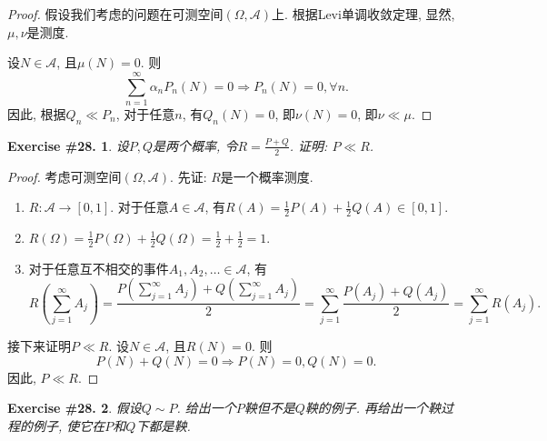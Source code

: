 \documentclass[UTF8, a4paper]{article}
\newtheorem{exercise}{Exercise \#28.}
\begin{document}
\begin{proof}
假设我们考虑的问题在可测空间\((\Omega, \mathcal{A})\)上.
根据Levi单调收敛定理, 显然, \(\mu, \nu\)是测度.

设\(N \in \mathcal{A}\), 且\(\mu(N) = 0\).
则
$$
\sum_{n=1}^{\infty} \alpha_n P_n(N) = 0 \Rightarrow P_n(N) = 0, \forall n.
$$
因此, 根据\(Q_n \ll P_n\), 对于任意\(n\), 有\(Q_n(N) = 0\), 即\(\nu(N) = 0\), 即\(\nu \ll \mu\).
\end{proof}


\begin{framed}
\begin{exercise}
设\(P,Q\)是两个概率, 令\(R = \frac{P+Q}{2}\). 证明: \(P \ll R\).
\end{exercise}
\end{framed}

\begin{proof}
考虑可测空间\((\Omega, \mathcal{A})\).
先证: \(R\)是一个概率测度.
\begin{enumerate}
    \item \(R: \mathcal{A} \to [0, 1]\). 对于任意\(A \in \mathcal{A}\), 有\(R(A) = \frac{1}{2}P(A) + \frac{1}{2}Q(A) \in [0,1]\).
    \item \(R(\Omega) = \frac{1}{2}P(\Omega) + \frac{1}{2}Q(\Omega) = \frac{1}{2} + \frac{1}{2} = 1\).
    \item 对于任意互不相交的事件\(A_1, A_2, \ldots \in \mathcal{A}\), 有$$R\left(\sum_{j=1}^{\infty}A_j\right) = \frac{P\left(\sum_{j=1}^{\infty}A_j\right) + Q\left(\sum_{j=1}^{\infty}A_j\right)}{2} = \sum_{j=1}^{\infty} \frac{P(A_j) + Q(A_j)}{2} = \sum_{j=1}^{\infty} R(A_j).$$
\end{enumerate}

接下来证明\(P \ll R\). 设\(N\in \mathcal{A}\), 且\(R(N) = 0\). 则
$$
P(N) + Q(N) = 0 \Rightarrow P(N) = 0, Q(N) = 0.
$$
因此, \(P \ll R\).
\end{proof}


\begin{exercise}
假设\(Q \sim P\). 给出一个\(P\)鞅但不是\(Q\)鞅的例子.
再给出一个鞅过程的例子, 使它在\(P\)和\(Q\)下都是鞅.
\end{exercise}




\end{document}
